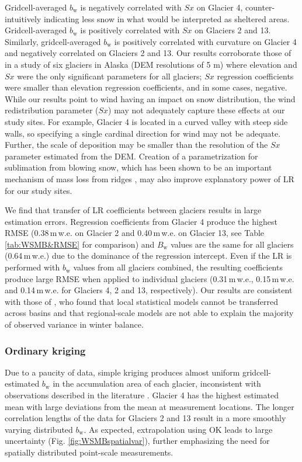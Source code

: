 \documentclass[twocolumn, letterpaper]{igs}
\begin{document}
Gridcell-averaged $b_\mathrm{w}$ is negatively correlated with $Sx$ on Glacier 4, counter-intuitively indicating less snow in what would be interpreted as sheltered areas. Gridcell-averaged $b_\mathrm{w}$ is positively correlated with $Sx$ on Glaciers 2 and 13. Similarly, gridcell-averaged $b_\mathrm{w}$ is positively correlated with curvature on Glacier 4 and negatively correlated on Glaciers 2 and 13. Our results corroborate those of \cite{McGrath2015} in a study of six glaciers in Alaska (DEM resolutions of 5 m) where elevation and $Sx$ were the only significant parameters for all glaciers; $Sx$ regression coefficients were smaller than elevation regression coefficients, and in some cases, negative. While our results point to wind having an impact on snow distribution, the wind redistribution parameter ($Sx$) may not adequately capture these effects at our study sites. For example, Glacier 4 is located in a curved valley with steep side walls, so specifying a single cardinal direction for wind may not be adequate. Further, the scale of deposition may be smaller than the resolution of the $Sx$ parameter estimated from the DEM. Creation of a parametrization for sublimation from blowing snow, which has been shown to be an important mechanism of mass loss from ridges \citep[e.g.][]{Musselman2015}, may also improve explanatory power of LR for our study sites.

We find that transfer of LR coefficients between glaciers results in large estimation errors. Regression coefficients from Glacier 4 produce the highest RMSE (0.38\,m\,w.e. on Glacier 2 and 0.40\,m\,w.e. on Glacier 13, see Table \ref{tab:WSMB&RMSE} for comparison) and $B_\mathrm{w}$ values are the same for all glaciers (0.64\,m\,w.e.) due to the dominance of the regression intercept. Even if the LR is performed with $b_\mathrm{w}$ values from all glaciers combined, the resulting coefficients produce large RMSE when applied to  individual glaciers (0.31\,m\,w.e., 0.15\,m\,w.e. and 0.14\,m\,w.e. for Glaciers 4, 2 and 13, respectively). Our results are consistent with those of \cite{Grunewald2013}, who found that local statistical models cannot be transferred across basins and that regional-scale models are not able to explain the majority of observed variance in winter balance. 

\subsubsection{Ordinary kriging}

Due to a paucity of data, simple kriging produces almost uniform gridcell-estimated $b_\mathrm{w}$ in the accumulation area of each glacier, inconsistent with observations described in the literature \citep[e.g.][]{Machguth2006, Grabiec2011}. Glacier 4 has the highest estimated mean with large deviations from the mean at measurement locations. The longer correlation lengths of the data for Glaciers 2 and 13 result in a more smoothly varying distributed $b_\mathrm{w}$. As expected, extrapolation using OK leads to large uncertainty (Fig. \ref{fig:WSMBspatialvar}), further emphasizing the need for spatially distributed point-scale measurements. 
\end{document}
